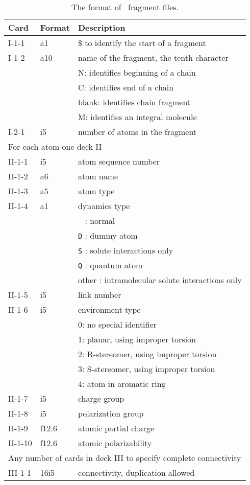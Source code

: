 \begin{table}[htbp]
\begin{center}
\begin{tabular}{p{15mm}p{12mm}l}
\hline\hline
Card & Format & Description \\ \hline
I-1-1  & a1     & \$ to identify the start of a fragment \\ %
I-1-2  & a10    & name of the fragment, the tenth character\\
       &        & N: identifies beginning of a chain\\
       &        & C: identifies end of a chain\\
       &        & blank: identifies chain fragment\\
       &        & M: identifies an integral molecule\\
\hline
I-2-1  & i5     & number of atoms in the fragment\\ 
\hline
\multicolumn{3}{l}{For each atom one deck II} \\
\hline
II-1-1  & i5     & atom sequence number \\
II-1-2  & a6     & atom name \\
II-1-3  & a5     & atom type \\
II-1-4  & a1     & dynamics type\\
        &        & \verb+ + : normal\\
        &        & \verb+D+ : dummy atom\\
        &        & \verb+S+ : solute interactions only\\
        &        & \verb+Q+ : quantum atom\\
        &        & other : intramolecular solute interactions only\\
II-1-5  & i5     & link number\\
II-1-6  & i5     & environment type\\
        &        & 0: no special identifier\\
        &        & 1: planar, using improper torsion\\
        &        & 2: R-stereomer, using improper torsion\\
        &        & 3: S-stereomer, using improper torsion\\
        &        & 4: atom in aromatic ring\\
II-1-7  & i5     & charge group\\
II-1-8  & i5     & polarization group\\
II-1-9  & f12.6  & atomic partial charge\\
II-1-10 & f12.6  & atomic polarizability\\
\hline
\multicolumn{3}{l}{Any number of cards in deck III to specify complete 
connectivity} \\
\hline
III-1-1  & 16i5   & connectivity, duplication allowed\\ 
\hline\hline
\end{tabular}
\caption{The format of \nwargos\ fragment files.\label{tbl:nwafrag}}
\end{center}
\end{table}


